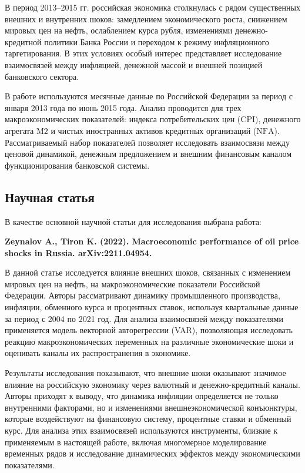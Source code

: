 \documentclass[12pt,a4paper]{article}
\begin{document}
В период 2013--2015 гг. российская экономика столкнулась с рядом существенных внешних и
внутренних шоков: замедлением экономического роста, снижением мировых цен на нефть,
ослаблением курса рубля, изменениями денежно-кредитной политики Банка России и переходом к
режиму инфляционного таргетирования. В этих условиях особый интерес представляет
исследование взаимосвязей между инфляцией, денежной массой и внешней позицией банковского
сектора.

В работе используются месячные данные по Российской Федерации за период с января 2013 года
по июнь 2015 года. Анализ проводится для трех макроэкономических показателей: индекса
потребительских цен ($\mathrm{CPI}$), денежного агрегата $\mathrm{M2}$ и чистых иностранных активов кредитных
организаций ($\mathrm{NFA}$). Рассматриваемый набор показателей позволяет исследовать взаимосвязи
между ценовой динамикой, денежным предложением и внешним финансовым каналом функционирования
банковской системы.

\subsection{Научная статья}
В качестве основной научной статьи для исследования выбрана работа:

\begin{center}
\textbf{Zeynalov A., Tiron K. (2022). Macroeconomic performance of oil price shocks in
Russia. arXiv:2211.04954.}
\end{center}

В данной статье исследуется влияние внешних шоков, связанных с изменением мировых цен на
нефть, на макроэкономические показатели Российской Федерации. Авторы рассматривают динамику
промышленного производства, инфляции, обменного курса и процентных ставок, используя
квартальные данные за период с 2004 по 2021 год. Для анализа взаимосвязей между
показателями применяется модель векторной авторегрессии (VAR), позволяющая исследовать
реакцию макроэкономических переменных на различные экономические шоки и оценивать каналы их
распространения в экономике.

Результаты исследования показывают, что внешние шоки оказывают значимое влияние на
российскую экономику через валютный и денежно-кредитный каналы. Авторы приходят к выводу,
что динамика инфляции определяется не только внутренними факторами, но и изменениями
внешнеэкономической конъюнктуры, которые воздействуют на финансовую систему, процентные
ставки и обменный курс. Для анализа этих взаимосвязей используются инструменты, близкие к
применяемым в настоящей работе, включая многомерное моделирование временных рядов и
исследование динамических эффектов между экономическими показателями.
\end{document}
